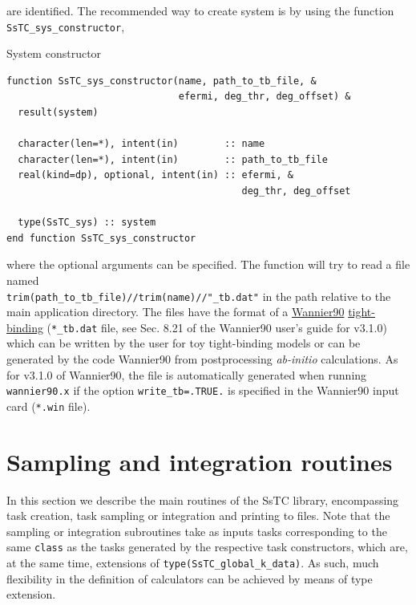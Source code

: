 \documentclass[10pt,a4paper]{article}
\begin{document}
are identified.
The recommended way to create system is by using the function \verb|SsTC_sys_constructor|,
\begin{codebox}{System constructor}
\begin{lstlisting}[caption={Interface of the system constructor.},captionpos=b]
function SsTC_sys_constructor(name, path_to_tb_file, &
                              efermi, deg_thr, deg_offset) &
  result(system)

  character(len=*), intent(in)        :: name
  character(len=*), intent(in)        :: path_to_tb_file
  real(kind=dp), optional, intent(in) :: efermi, &
                                         deg_thr, deg_offset

  type(SsTC_sys) :: system
end function SsTC_sys_constructor
\end{lstlisting}
\end{codebox}
where the optional arguments can be specified. The function will try to read a file named \\ \verb|trim(path_to_tb_file)//trim(name)//"_tb.dat"| in the path relative to the main application directory. The files have the format of a \href{https://wannier.org/}{Wannier90} \cite{pizziWannier90CommunityCode2020} \href{https://raw.githubusercontent.com/wannier-developers/wannier90/v3.1.0/doc/compiled_docs/user_guide.pdf}{tight-binding} (\verb|*_tb.dat| file, see Sec. 8.21 of the Wannier90 user's guide for v3.1.0) which can be written by the user for toy tight-binding models or can be generated by the code Wannier90 from postprocessing \textit{ab-initio} calculations. As for v3.1.0 of Wannier90, the file is automatically generated when running \verb|wannier90.x| if the option \verb|write_tb=.TRUE.| is specified in the Wannier90 input card (\verb|*.win| file).
\section{Sampling and integration routines}\label{sec: sampling_integration}
In this section we describe the main routines of the SsTC library, encompassing task creation, task sampling or integration and printing to files. Note that the sampling or integration subroutines take as inputs tasks corresponding to the same \verb|class| as the tasks generated by the respective task constructors, which are, at the same time, extensions of \verb|type(SsTC_global_k_data)|. As such, much flexibility in the definition of calculators can be achieved by means of type extension.
\end{document}

